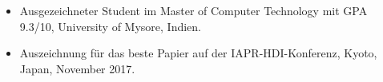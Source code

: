 \vspace{0.1cm}
\begin{itemize}
    \item Ausgezeichneter Student im Master of Computer Technology mit GPA 9.3/10, University of Mysore, Indien.
    \item Auszeichnung für das beste Papier auf der IAPR-HDI-Konferenz, Kyoto, Japan, November 2017.
\end{itemize}